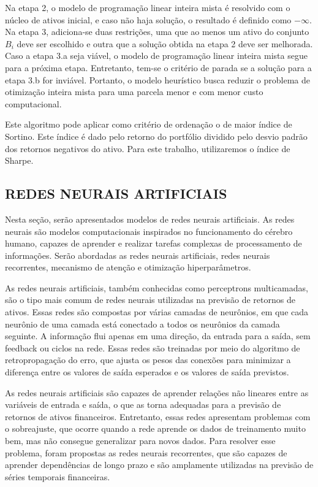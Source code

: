                     \ipar Na etapa 2, o modelo de programação linear inteira mista é resolvido com o núcleo de ativos inicial, e caso não haja solução, o resultado é definido como $-\infty$. Na etapa 3, adiciona-se duas restrições, uma que ao menos um ativo do conjunto $B_i$ deve ser escolhido e outra que a solução obtida na etapa 2 deve ser melhorada. Caso a etapa 3.a seja viável, o modelo de programação linear inteira mista segue para a próxima etapa. Entretanto, tem-se o critério de parada se a solução para a etapa 3.b for inviável. Portanto, o modelo heurístico busca reduzir o problema de otimização inteira mista para uma parcela menor e com menor custo computacional. 

                    \ipar Este algoritmo pode aplicar como critério de ordenação o de maior índice de Sortino. Este índice é dado pelo retorno do portfólio dividido pelo desvio padrão dos retornos negativos do ativo. Para este trabalho, utilizaremos o índice de Sharpe.
       
    \subsection{REDES NEURAIS ARTIFICIAIS}
        \label{sec:redesneurais}

        Nesta seção, serão apresentados modelos de redes neurais artificiais. As redes neurais são modelos computacionais inspirados no funcionamento do cérebro humano, capazes de aprender e realizar tarefas complexas de processamento de informações. Serão abordadas as redes neurais artificiais, redes neurais recorrentes, mecanismo de atenção e otimização hiperparâmetros.
        
        \ipar As redes neurais artificiais, também conhecidas como perceptrons multicamadas, são o tipo mais comum de redes neurais utilizadas na previsão de retornos de ativos. Essas redes são compostas por várias camadas de neurônios, em que cada neurônio de uma camada está conectado a todos os neurônios da camada seguinte. A informação flui apenas em uma direção, da entrada para a saída, sem feedback ou ciclos na rede. Essas redes são treinadas por meio do algoritmo de retropropagação do erro, que ajusta os pesos das conexões para minimizar a diferença entre os valores de saída esperados e os valores de saída previstos.

        \ipar As redes neurais artificiais são capazes de aprender relações não lineares entre as variáveis de entrada e saída, o que as torna adequadas para a previsão de retornos de ativos financeiros. Entretanto, essas redes apresentam problemas com o sobreajuste, que ocorre quando a rede aprende os dados de treinamento muito bem, mas não consegue generalizar para novos dados. Para resolver esse problema, foram propostas as redes neurais recorrentes, que são capazes de aprender dependências de longo prazo e são amplamente utilizadas na previsão de séries temporais financeiras.

